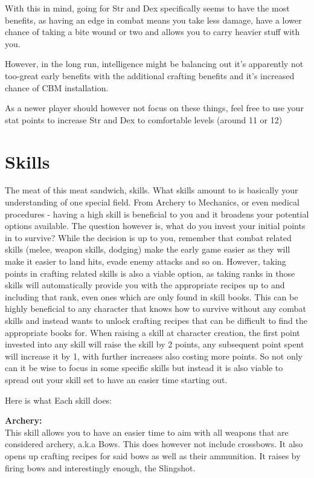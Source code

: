 With this in mind, going for Str and Dex specifically seems to have the most benefits, as having an edge in combat means you take less damage, have a lower chance of taking a bite wound or two and allows you to carry heavier stuff with you.

However, in the long run, intelligence might be balancing out it's apparently not too-great early benefits with the additional crafting benefits and it's increased chance of CBM installation.

As a newer player should however not focus on these things, feel free to use your stat points to increase Str and Dex to comfortable levels (around 11 or 12)

\section{Skills}

The meat of this meat sandwich, skills. What skills amount to is basically your understanding of one special field. From Archery to Mechanics, or even medical procedures - having a high skill is beneficial to you and it broadens your potential options available. The question however is, what do you invest your initial points in to survive? While the decision is up to you, remember that combat related skills (melee, weapon skills, dodging) make the early game easier as they will make it easier to land hits, evade enemy attacks and so on. However, taking points in crafting related skills is also a viable option, as taking ranks in those skills will automatically provide you with the appropriate recipes up to and including that rank, even ones which are only found in skill books. This can be highly beneficial to any character that knows how to survive without any combat skills and instead wants to unlock crafting recipes that can be difficult to find the appropriate books for. When raising a skill at character creation, the first point invested into any skill will raise the skill by 2 points, any subsequent point spent will increase it by 1, with further increases also costing more points. So not only can it be wise to focus in some specific skills but instead it is also viable to spread out your skill set to have an easier time starting out.

Here is what Each skill does:

\textbf{Archery:}\\This skill allows you to have an easier time to aim with all weapons that are considered archery, a.k.a Bows. This does however not include crossbows. It also opens up crafting recipes for said bows as well as their ammunition. It raises by firing bows and interestingly enough, the Slingshot.

